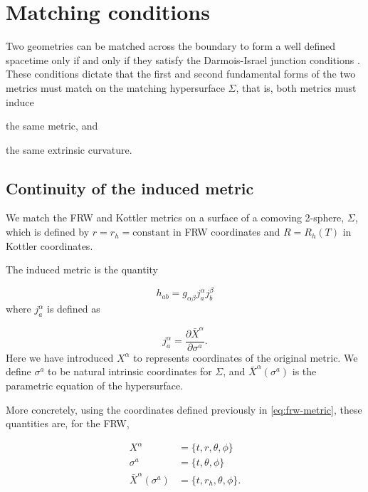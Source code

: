 \section{Matching conditions}

Two geometries can be matched across the boundary to form a well defined spacetime only if and only if they satisfy the Darmois-Israel junction conditions \citep{darmois1927equations,israel1966singular}. These conditions dictate that the first and second fundamental forms of the two metrics must match on the matching hypersurface $\Sigma$, that is, both metrics must induce 
\begin{inparaenum}[(i)]
  \item the same metric, and 
  \item the same extrinsic curvature.
\end{inparaenum}

\subsection{Continuity of the induced metric}

We match the FRW and Kottler metrics on a surface of a comoving 2-sphere, $\Sigma$, which is defined by $r = r_h = \text{constant}$ in FRW coordinates and $R = R_h(T)$ in Kottler coordinates.

The induced metric is the quantity 

\begin{equation}
  h_{ab} = g_{\alpha \beta} j^{\alpha}_{a} j^{\beta}_{b}
  \label{eq:induced-metric-defn}
\end{equation}
where $j^{\alpha}_{a}$ is defined as

\begin{equation}
  j^{\alpha}_{a} = \frac{\partial \bar{X}^{\alpha}}{\partial \sigma^a}.
  \label{eq:j-defn}
\end{equation}
Here we have introduced $X^{\alpha}$ to represents coordinates of the original metric. We define $\sigma^a$ to be natural intrinsic coordinates for $\Sigma$, and $\bar{X}^{\alpha}(\sigma^a)$ is the parametric equation of the hypersurface. 

More concretely, using the coordinates defined previously in \autoref{eq:frw-metric}, these quantities are, for the FRW, 

\begin{subequations}
  \begin{align}
    X^{\alpha} &= \{ t, r, \theta, \phi \} \\
    \sigma^a &= \{ t, \theta, \phi \} \\
    \bar{X}^{\alpha}(\sigma^a) &= \{ t, r_h, \theta, \phi\}.
  \end{align}
\end{subequations}

